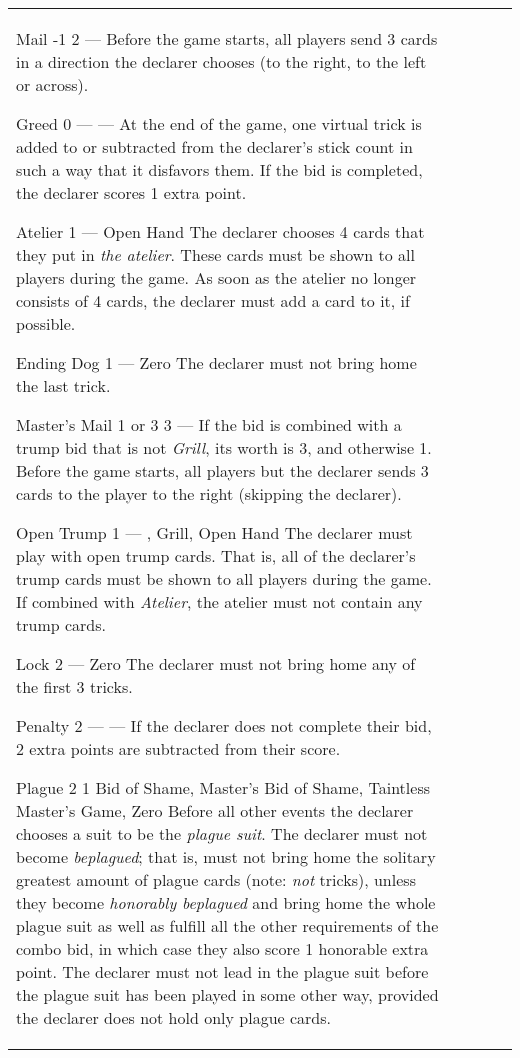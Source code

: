\begin{table}
\begin{center}
\begin{tabularx}{\textwidth}{
			l
			S[table-number-alignment=center, table-format=1.0]
			S[table-number-alignment=center, table-format=1.0]
			p{3cm}
			|X
		}
			\specialBidItem%
			{Mail}
			{-1}
			{2}
			{---}
			{%
				Before the game starts, all players send 3 cards in a direction the declarer chooses (to the right, to the left or across).
			}

			\specialBidItem%
			{Greed}
			{0}
			{{---}}
			{---}
			{%
				At the end of the game, one virtual trick is added to or subtracted from the declarer's stick count in such a way that it disfavors them. If the bid is completed, the declarer scores 1 extra point.
			}

			\specialBidItem%
			{Atelier}
			{1}
			{{---}}
			{Open Hand}
			{%
				The declarer chooses 4 cards that they put in \emph{the atelier}. These cards must be shown to all players during the game. As soon as the atelier no longer consists of 4 cards, the declarer must add a card to it, if possible.
			}

			\specialBidItem%
			{Ending Dog}
			{1}
			{{---}}
			{Zero}
			{%
				The declarer must not bring home the last trick.
			}

			\specialBidItem%
			{Master's Mail}
			{{1 or 3}}
			{3}
			{---}
			{%
				If the bid is combined with a trump bid that is not \emph{Grill}, its worth is 3, and otherwise 1. Before the game starts, all players but the declarer sends 3 cards to the player to the right (skipping the declarer).
			}

			\specialBidItem%
			{Open Trump}
			{1}
			{{---}}
			{\nonTrump, Grill, Open Hand}
			{%
				The declarer must play with open trump cards. That is, all of the declarer’s trump cards must be shown to all players during the game. If combined with \emph{Atelier}, the atelier must not contain any trump cards.
			}

			\specialBidItem%
			{Lock}
			{2}
			{{---}}
			{Zero}
			{%
				The declarer must not bring home any of the first 3 tricks.
			}

			\specialBidItem%
			{Penalty}
			{2}
			{{---}}
			{---}
			{%
				If the declarer does not complete their bid, 2 extra points are subtracted from their score.
			}

			\specialBidItem%
			{Plague}
			{2}
			{1}
			{Bid of Shame, Master's Bid of Shame, Taintless Master's Game, Zero}
			{%
				Before all other events the declarer chooses a suit to be the \emph{plague suit}. The declarer must not become \emph{beplagued}; that is, must not bring home the solitary greatest amount of plague cards (note: \emph{not} tricks), unless they become \emph{honorably beplagued} and bring home the whole plague suit as well as fulfill all the other requirements of the combo bid, in which case they also score 1 honorable extra point. The declarer must not lead in the plague suit before the plague suit has been played in some other way, provided the declarer does not hold only plague cards.
			}


\end{tabularx}
\end{center}
\end{table}

